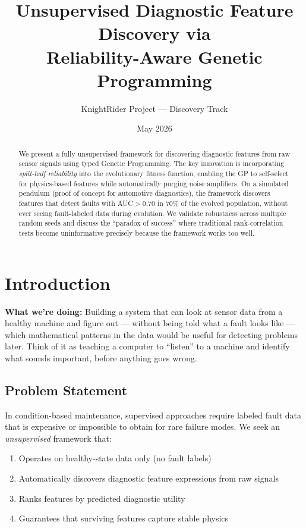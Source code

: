 \documentclass[11pt,a4paper]{article}
\title{Unsupervised Diagnostic Feature Discovery via\\
Reliability-Aware Genetic Programming}
\author{KnightRider Project — Discovery Track}
\date{May 2026}
\begin{document}
\maketitle

\begin{abstract}
We present a fully unsupervised framework for discovering diagnostic features
from raw sensor signals using typed Genetic Programming. The key innovation is
incorporating \emph{split-half reliability} into the evolutionary fitness
function, enabling the GP to self-select for physics-based features while
automatically purging noise amplifiers. On a simulated pendulum (proof of
concept for automotive diagnostics), the framework discovers features that
detect faults with AUC$>$0.70 in 70\% of the evolved population, without ever
seeing fault-labeled data during evolution. We validate robustness across
multiple random seeds and discuss the ``paradox of success'' where traditional
rank-correlation tests become uninformative precisely because the framework
works too well.
\end{abstract}

\tableofcontents
\newpage

\section{Introduction}

\begin{plainbox}
\textbf{What we're doing:} Building a system that can look at sensor data from
a healthy machine and figure out --- without being told what a fault looks like
--- which mathematical patterns in the data would be useful for detecting
problems later. Think of it as teaching a computer to ``listen'' to a machine
and identify what sounds important, before anything goes wrong.
\end{plainbox}

\subsection{Problem Statement}

In condition-based maintenance, supervised approaches require labeled fault
data that is expensive or impossible to obtain for rare failure modes. We
seek an \emph{unsupervised} framework that:
\begin{enumerate}
    \item Operates on healthy-state data only (no fault labels)
    \item Automatically discovers diagnostic feature expressions from raw signals
    \item Ranks features by predicted diagnostic utility
    \item Guarantees that surviving features capture stable physics
\end{enumerate}
\end{document}
